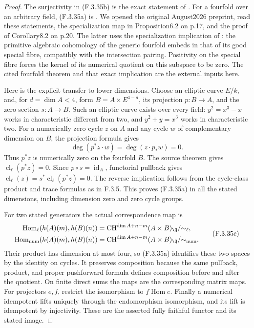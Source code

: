 \begin{proof}
The surjectivity in (F.3.35b) is the exact statement of
\cite[Theorem 1.1, p.1]{RootBroe2026Fourfold}.
For a fourfold over an arbitrary field, (F.3.35a) is
\cite[Corollaries 1.2 and 8.2, pp.2 and 20]{RootBroe2026Fourfold}.
We opened the original August2026 preprint, read these statements,
the specialization map in Proposition6.2 on p.17, and the proof of
Corollary8.2 on p.20. The latter uses the specialization implication
of \cite[Corollary 3.19, p.13]{RootAncona2020Fourfold}:
the primitive algebraic cohomology of the generic fourfold embeds
in that of its good special fibre, compatibly with the intersection
pairing. Positivity on the special fibre forces the kernel of its
numerical quotient on this subspace to be zero. The cited fourfold
theorem and that exact implication are the external inputs here.

Here is the explicit transfer to lower dimensions. Choose an
elliptic curve \(E/k\), and, for \(d=\dim A<4\), form
\(B=A\times E^{4-d}\), its projection \(p:B\to A\), and the
zero section \(s:A\to B\). Such an elliptic curve exists over
every field: \(y^2=x^3-x\) works in characteristic different
from two, and \(y^2+y=x^3\) works in characteristic two.
For a numerically zero cycle \(z\) on \(A\) and any cycle
\(w\) of complementary dimension on \(B\), the projection formula
gives
\[
       \deg(p^*z\cdot w)=\deg(z\cdot p_*w)=0.
\]
Thus \(p^*z\) is numerically zero on the fourfold \(B\).
The source theorem gives \(\operatorname{cl}_\ell(p^*z)=0\).
Since \(p\circ s=\operatorname{id}_A\), functorial pullback gives
\(\operatorname{cl}_\ell(z)=s^*\operatorname{cl}_\ell(p^*z)=0\).
The reverse implication follows from the cycle-class product
and trace formulas as in F.3.5. This proves (F.3.35a) in all the
stated dimensions, including dimension zero and zero cycle groups.

For two stated generators the actual correspondence map is
\[
\begin{aligned}
 \operatorname{Hom}_{\ell}(h(A)(m),h(B)(n))
   &=\operatorname{CH}^{\dim A+n-m}(A\times B)_{\Q}/{\sim_\ell},\\
 \operatorname{Hom}_{\rm num}(h(A)(m),h(B)(n))
   &=\operatorname{CH}^{\dim A+n-m}(A\times B)_{\Q}/{\sim_{\rm num}}.
\end{aligned}
\tag{F.3.35c}
\]
Their product has dimension at most four, so (F.3.35a) identifies
these two spaces by the identity on cycles. It preserves composition
because the same pullback, product, and proper pushforward formula
defines composition before and after the quotient. On finite direct
sums the maps are the corresponding matrix maps. For projectors
\(e,f\), restrict the isomorphism to \(f\operatorname{Hom}e\).
Finally a numerical idempotent lifts uniquely through the endomorphism
isomorphism, and its lift is idempotent by injectivity. These are
the asserted fully faithful functor and its stated image.


\end{proof}
